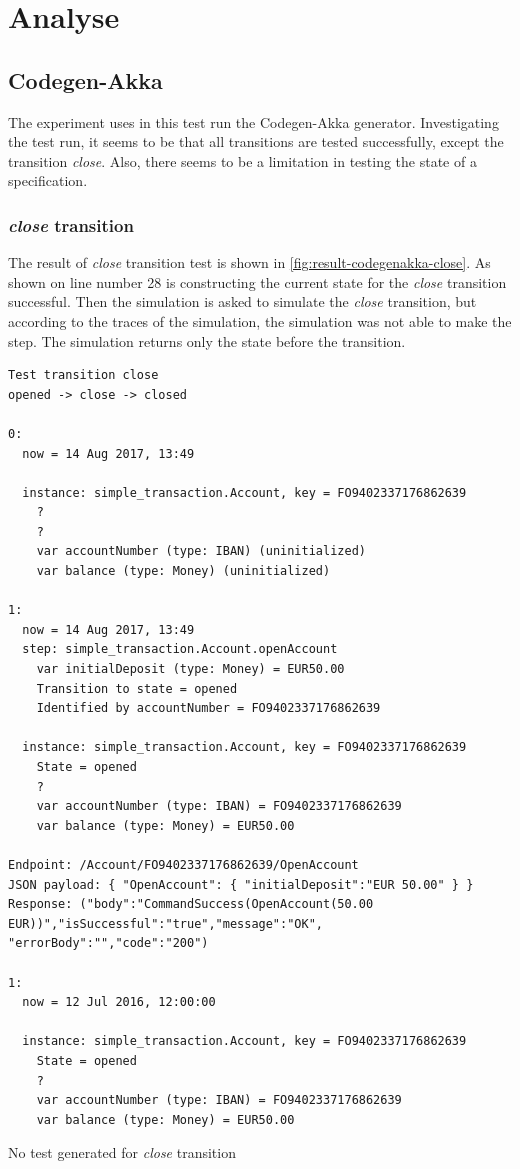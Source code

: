 \section{Analyse}

\subsection{Codegen-Akka}
The experiment uses in this test run the Codegen-Akka generator.
Investigating the test run, it seems to be that all transitions are tested
successfully, except the transition \textit{close}. Also, there seems to be a
limitation in testing the state of a specification.

\subsubsection{\textit{close} transition}\label{sec:close-no-test-codegenakka}

The result of \textit{close} transition test is shown in
\autoref{fig:result-codegenakka-close}. As shown on line number 28 is
constructing the current state for the \textit{close} transition successful. Then the
simulation is asked to simulate the \textit{close} transition, but according to the
traces of the simulation, the simulation was not able to make the step. The
simulation returns only the state before the transition.

\begin{sourcecode}[h!]
\begin{lstlisting}[]
Test transition close
opened -> close -> closed

0:
  now = 14 Aug 2017, 13:49

  instance: simple_transaction.Account, key = FO9402337176862639
    ?
    ?
    var accountNumber (type: IBAN) (uninitialized)
    var balance (type: Money) (uninitialized)

1:
  now = 14 Aug 2017, 13:49
  step: simple_transaction.Account.openAccount
    var initialDeposit (type: Money) = EUR50.00
    Transition to state = opened
    Identified by accountNumber = FO9402337176862639

  instance: simple_transaction.Account, key = FO9402337176862639
    State = opened
    ?
    var accountNumber (type: IBAN) = FO9402337176862639
    var balance (type: Money) = EUR50.00

Endpoint: /Account/FO9402337176862639/OpenAccount
JSON payload: { "OpenAccount": { "initialDeposit":"EUR 50.00" } }
Response: ("body":"CommandSuccess(OpenAccount(50.00 EUR))","isSuccessful":"true","message":"OK",
"errorBody":"","code":"200")

1:
  now = 12 Jul 2016, 12:00:00

  instance: simple_transaction.Account, key = FO9402337176862639
    State = opened
    ?
    var accountNumber (type: IBAN) = FO9402337176862639
    var balance (type: Money) = EUR50.00
\end{lstlisting}
\caption{No test generated for \textit{close} transition}\label{fig:result-codegenakka-close}
\end{sourcecode}
\FloatBarrier

